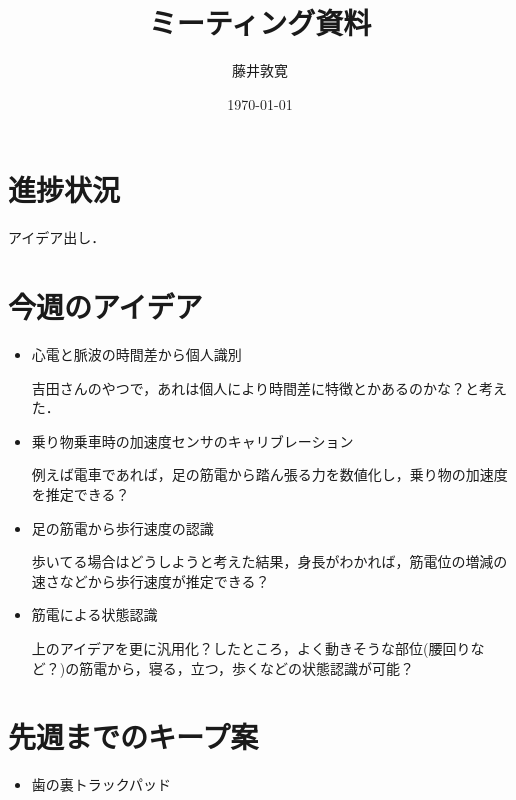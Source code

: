 \documentclass[a4j,twocolumn,10pt]{jarticle}
\title{ミーティング資料}
\author{藤井敦寛}
\date{\today}
\begin{document}
\maketitle

\section{進捗状況}
アイデア出し．

\section{今週のアイデア}
\begin{itemize}
  \item 心電と脈波の時間差から個人識別

  吉田さんのやつで，あれは個人により時間差に特徴とかあるのかな？と考えた．

  \item 乗り物乗車時の加速度センサのキャリブレーション

  例えば電車であれば，足の筋電から踏ん張る力を数値化し，乗り物の加速度を推定できる？

  \item 足の筋電から歩行速度の認識

  歩いてる場合はどうしようと考えた結果，身長がわかれば，筋電位の増減の速さなどから歩行速度が推定できる？

  \item 筋電による状態認識

  上のアイデアを更に汎用化？したところ，よく動きそうな部位(腰回りなど？)の筋電から，寝る，立つ，歩くなどの状態認識が可能？
\end{itemize}

\section{先週までのキープ案}
\begin{itemize}
  \item 歯の裏トラックパッド
\end{itemize}
\end{document}
